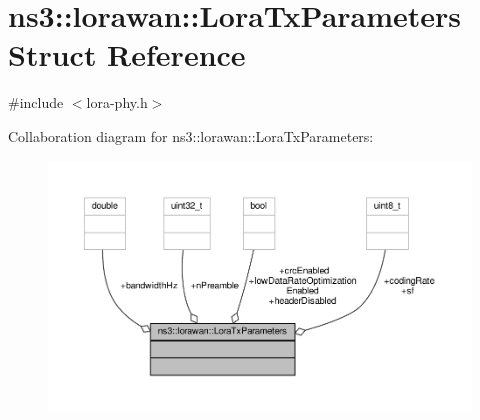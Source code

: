 \hypertarget{structns3_1_1lorawan_1_1LoraTxParameters}{}\section{ns3\+:\+:lorawan\+:\+:Lora\+Tx\+Parameters Struct Reference}
\label{structns3_1_1lorawan_1_1LoraTxParameters}


{\ttfamily \#include $<$lora-\/phy.\+h$>$}



Collaboration diagram for ns3\+:\+:lorawan\+:\+:Lora\+Tx\+Parameters\+:
\nopagebreak
\begin{figure}[H]
\begin{center}
\leavevmode
\includegraphics[width=350pt]{structns3_1_1lorawan_1_1LoraTxParameters__coll__graph}
\end{center}
\end{figure}
